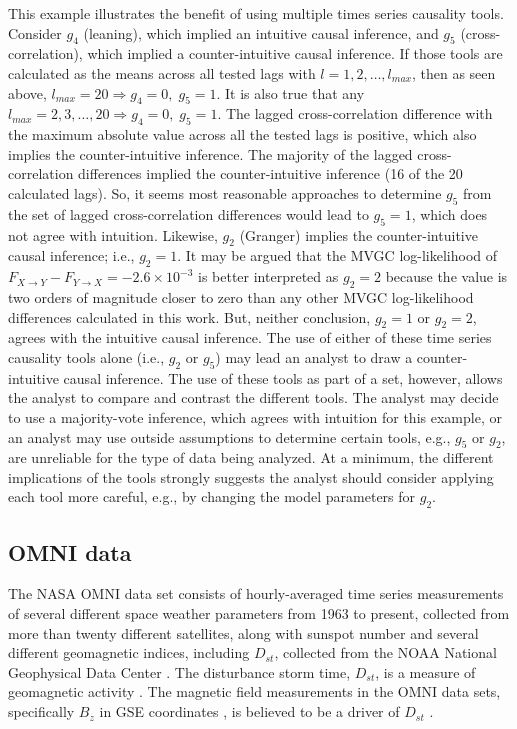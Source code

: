 This example illustrates the benefit of using multiple times series causality tools.  Consider $g_4$ (leaning), which implied an intuitive causal inference, and $g_5$ (cross-correlation), which implied a counter-intuitive causal inference.  If those tools are calculated as the means across all tested lags with $l=1,2,\ldots,l_{max}$, then as seen above, $l_{max}=20\Rightarrow g_4=0,\;g_5=1$.  It is also true that any $l_{max}=2,3,\ldots,20\Rightarrow g_4=0,\;g_5=1$.  The lagged cross-correlation difference with the maximum absolute value across all the tested lags is positive, which also implies the counter-intuitive inference.  The majority of the lagged cross-correlation differences implied the counter-intuitive inference (16 of the 20 calculated lags).  So, it seems most reasonable approaches to determine $g_5$ from the set of lagged cross-correlation differences would lead to $g_5=1$, which does not agree with intuition.  Likewise, $g_2$ (Granger) implies the counter-intuitive causal inference; i.e., $g_2=1$.  It may be argued that the MVGC log-likelihood of $F_{X\rightarrow Y}-F_{Y\rightarrow X}=-2.6\times 10^{-3}$ is better interpreted as $g_2=2$ because the value is two orders of magnitude closer to zero than any other MVGC log-likelihood differences calculated in this work.  But, neither conclusion, $g_2=1$ or $g_2=2$, agrees with the intuitive causal inference.  The use of either of these time series causality tools alone (i.e., $g_2$ or $g_5$) may lead an analyst to draw a counter-intuitive causal inference.  The use of these tools as part of a set, however, allows the analyst to compare and contrast the different tools.  The analyst may decide to use a majority-vote inference, which agrees with intuition for this example, or an analyst may use outside assumptions to determine certain tools, e.g., $g_5$ or $g_2$, are unreliable for the type of data being analyzed.  At a minimum, the different implications of the tools strongly suggests the analyst should consider applying each tool more careful, e.g., by changing the model parameters for $g_2$.

\subsection{OMNI data}
The NASA OMNI data set consists of hourly-averaged time series measurements of several different space weather parameters from 1963 to present, collected from more than twenty different satellites, along with sunspot number and several different geomagnetic indices, including $D_{st}$, collected from the NOAA National Geophysical Data Center \cite{King2005}.  The disturbance storm time, $D_{st}$, is a measure of geomagnetic activity \cite{IAGA}.  The magnetic field measurements in the OMNI data sets, specifically $B_z$ in GSE coordinates \cite{Hapgood1992}, is believed to be a driver of $D_{st}$ \cite{Gonz1994}.

